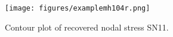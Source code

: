 \documentclass{book}
\begin{document}
\begin{figure}[h]
  \centerline{\texttt{[image: figures/examplemh104r.png]}}
  \caption{Contour plot of recovered nodal stress SN11.}
  \label{fig:mh104r}
\end{figure}






\end{document}
